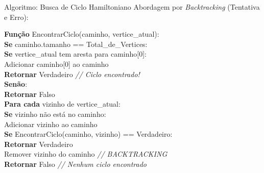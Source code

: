 \documentclass[9pt]{beamer}
\begin{document}
\begin{frame}{Algoritmo: Busca de Ciclo Hamiltoniano}
    Abordagem por \textit{Backtracking} (Tentativa e Erro):\\
    \vspace{0.2cm}
    \begin{ttfamily}
    
    \textbf{Função} EncontrarCiclo(caminho, vertice\_atual): \\
    \hspace{0.4cm} \textbf{Se} caminho.tamanho == Total\_de\_Vertices: \\
    \hspace{0.8cm} \textbf{Se} vertice\_atual tem aresta para caminho[0]: \\
    \hspace{1.2cm} Adicionar caminho[0] ao caminho \\
    \hspace{1.2cm} \textbf{Retornar} Verdadeiro \hspace{0.2cm}\textit{// Ciclo encontrado!} \\
    \hspace{0.8cm} \textbf{Senão}: \\
    \hspace{1.2cm} \textbf{Retornar} Falso \\
    \vspace{0.2cm}
    \hspace{0.4cm} \textbf{Para cada} vizinho de vertice\_atual: \\
    \hspace{0.8cm} \textbf{Se} vizinho não está no caminho: \\
    \hspace{1.2cm} Adicionar vizinho ao caminho \\
    \hspace{1.2cm} \textbf{Se} EncontrarCiclo(caminho, vizinho) == Verdadeiro: \\
    \hspace{1.6cm} \textbf{Retornar} Verdadeiro \\
    \hspace{1.2cm} Remover vizinho do caminho \hspace{0.2cm}\textit{// BACKTRACKING} \\
    \vspace{0.2cm}
    \hspace{0.4cm} \textbf{Retornar} Falso \hspace{0.2cm}\textit{// Nenhum ciclo encontrado}
    \end{ttfamily}
\end{frame}
\end{document}

